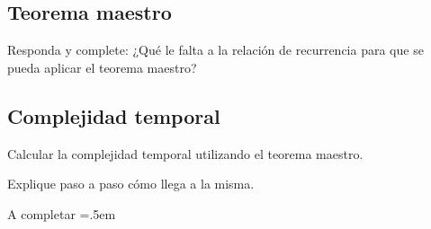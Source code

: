 \documentclass[titlepage,a4paper]{article}
\newenvironment{lcverbatim}
 {\SaveVerbatim{cverb}}
 {\endSaveVerbatim
  \flushleft\fboxrule=0pt\fboxsep=.5em
  \colorbox{cverbbg}{%
    \makebox[\dimexpr\linewidth-2\fboxsep][l]{\BUseVerbatim{cverb}}%
  }
  \endflushleft
}
\begin{document}
\newpage\subsection{Teorema maestro}
\begin{tcolorbox}[colback=blue!5!white,colframe=blue!75!black,title=Enunciado 2.1]
    Responda y complete: ¿Qué le falta a la relación de recurrencia para que se pueda aplicar el teorema maestro?
\end{tcolorbox}

\subsection{Complejidad temporal}
\begin{tcolorbox}[colback=blue!5!white,colframe=blue!75!black,title=Enunciado 2.2]
    Calcular la complejidad temporal utilizando el teorema maestro.
\end{tcolorbox}

\begin{tcolorbox}[colback=blue!5!white,colframe=blue!75!black,title=Enunciado 2.3]
    Explique paso a paso cómo llega a la misma.
\end{tcolorbox}

\begin{lcverbatim}
    A completar
\end{lcverbatim}
\end{document}
